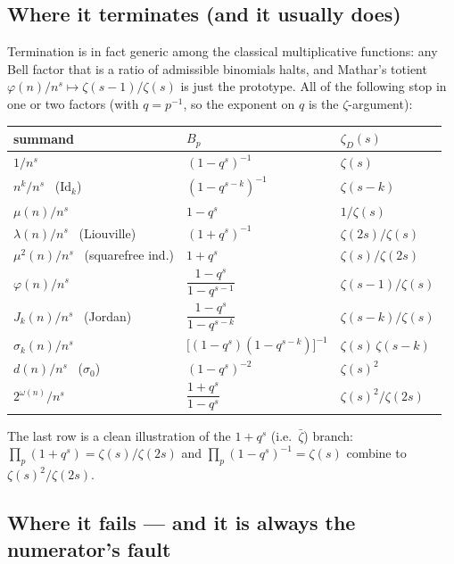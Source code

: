 \documentclass[11pt]{article}
\newcommand{\zD}{\zeta_D}
\newcommand{\zbar}{\bar\zeta}
\begin{document}
\subsection{Where it terminates (and it usually does)}

Termination is in fact generic among the classical multiplicative functions: any
Bell factor that is a ratio of admissible binomials halts, and Mathar's totient
$\varphi(n)/n^s\mapsto\zeta(s-1)/\zeta(s)$ is just the prototype. All of the
following stop in one or two factors (with $q=p^{-1}$, so the exponent on $q$ is the
$\zeta$-argument):

\begin{center}
\renewcommand{\arraystretch}{1.35}
\begin{tabular}{lll}
\hline
summand & $B_p$ & $\zD(s)$ \\
\hline
$1/n^s$ & $(1-q^{s})^{-1}$ & $\zeta(s)$ \\
$n^k/n^s$ \ ($\mathrm{Id}_k$) & $(1-q^{s-k})^{-1}$ & $\zeta(s-k)$ \\
$\mu(n)/n^s$ & $1-q^{s}$ & $1/\zeta(s)$ \\
$\lambda(n)/n^s$ \ (Liouville) & $(1+q^{s})^{-1}$ & $\zeta(2s)/\zeta(s)$ \\
$\mu^2(n)/n^s$ \ (squarefree ind.) & $1+q^{s}$ & $\zeta(s)/\zeta(2s)$ \\
$\varphi(n)/n^s$ & $\dfrac{1-q^{s}}{1-q^{s-1}}$ & $\zeta(s-1)/\zeta(s)$ \quad[Mathar (3.76)]\\
$J_k(n)/n^s$ \ (Jordan) & $\dfrac{1-q^{s}}{1-q^{s-k}}$ & $\zeta(s-k)/\zeta(s)$ \quad[Mathar (3.87)]\\
$\sigma_k(n)/n^s$ & $\big[(1-q^{s})(1-q^{s-k})\big]^{-1}$ & $\zeta(s)\,\zeta(s-k)$ \\
$d(n)/n^s$ \ ($\sigma_0$) & $(1-q^{s})^{-2}$ & $\zeta(s)^2$ \\
$2^{\omega(n)}/n^s$ & $\dfrac{1+q^{s}}{1-q^{s}}$ & $\zeta(s)^2/\zeta(2s)$ \\
\hline
\end{tabular}
\end{center}

The last row is a clean illustration of the $1+q^{s}$ (i.e.\ $\zbar$) branch:
$\prod_p(1+q^{s})=\zeta(s)/\zeta(2s)$ and $\prod_p(1-q^{s})^{-1}=\zeta(s)$ combine to
$\zeta(s)^2/\zeta(2s)$.

\subsection{Where it fails --- and it is always the numerator's fault}
\end{document}
